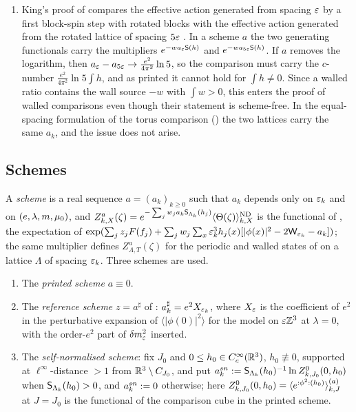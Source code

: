 \begin{remark}
\begin{enumerate}[label=\textup{(\alph*)},leftmargin=*]
\item King's proof of \cite[Thm.~2.4]{K2} compares the effective action generated from spacing $\varepsilon$ by a first block-spin step with rotated blocks with the effective action generated from the rotated lattice of spacing $5\varepsilon$ \cite[(4.3)--(4.9)]{K2}. In a scheme $a$ the two generating functionals carry the multipliers $e^{-wa_{\varepsilon}\mathsf S(h)}$ and $e^{-wa_{5\varepsilon}\mathsf S(h)}$. If $a$ removes the logarithm, then $a_{\varepsilon}-a_{5\varepsilon}\to\frac{e^2}{4\pi^2}\ln5$, so the comparison \cite[(4.6)]{K2} must carry the $c$-number $\frac{e^2}{4\pi^2}\ln5\int h$, and as printed it cannot hold for $\int h\ne0$. Since a walled ratio contains the wall source $-w$ with $\int w>0$, this enters the proof of walled comparisons even though their statement is scheme-free. In the equal-spacing formulation of the torus comparison () the two lattices carry the same $a_k$, and the issue does not arise.
\end{enumerate}
\end{remark}

\subsection{Schemes}

\begin{definition}[schemes]\label{rot:def:scheme}
A \emph{scheme} is a real sequence $a=(a_k)_{k\ge0}$ such that $a_k$ depends only on $\varepsilon_k$ and on $(e,\lambda,m,\mu_0)$, and $Z^a_{k,X}(\zeta)=e^{-\sum_jw_ja_k\mathsf S_{\Lambda_k}(h_j)}\langle\Theta(\zeta)\rangle^{\mathrm{ND}}_{k,X}$ is the functional of , the expectation of $\exp(\sum_jz_jF(f_j)+\sum_jw_j\sum_x\varepsilon_k^3h_j(x)[|\phi(x)|^2-2\mathsf W_{\varepsilon_k}-a_k])$; the same multiplier defines $Z^a_{\Lambda,T}(\zeta)$ for the periodic and walled states of  on a lattice $\Lambda$ of spacing $\varepsilon_k$. Three schemes are used.
\begin{enumerate}[label=\textup{(\roman*)},leftmargin=*]
\item The \emph{printed scheme} $a\equiv0$.
\item The \emph{reference scheme} $z=a^\sharp$ of : $a^\sharp_k=e^2X_{\varepsilon_k}$, where $X_{\varepsilon}$ is the coefficient of $e^2$ in the perturbative expansion of $\langle|\phi(0)|^2\rangle$ for the model on $\varepsilon\mathbb Z^3$ at $\lambda=0$, with the order-$e^2$ part of $\delta m^2_{\varepsilon}$ inserted.
\item The \emph{self-normalised scheme}: fix $J_0$ and $0\le h_0\in C^\infty_c(\mathbb R^3)$, $h_0\not\equiv0$, supported at $\ell^\infty$-distance $>1$ from $\mathbb R^3\setminus C_{J_0}$, and put $a^{sn}_k:=\mathsf S_{\Lambda_k}(h_0)^{-1}\ln Z^0_{k,J_0}(0,h_0)$ when $\mathsf S_{\Lambda_k}(h_0)>0$, and $a^{sn}_k:=0$ otherwise; here $Z^0_{k,J_0}(0,h_0)=\langle e^{{:}\phi^2{:}(h_0)}\rangle^{(a)}_{k,J}$ at $J=J_0$ is the functional of the comparison cube in the printed scheme.
\end{enumerate}
\end{definition}

